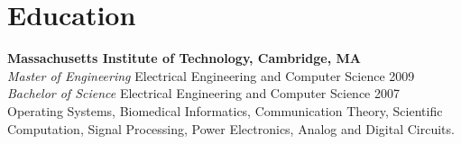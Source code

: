 \section{Education}

\textbf{Massachusetts Institute of Technology, Cambridge, MA}\\
\textit{Master of Engineering} Electrical Engineering and Computer Science
\hfill 2009 \\
\textit{Bachelor of Science} Electrical Engineering and Computer Science
\hfill 2007\\
Operating Systems, Biomedical Informatics, Communication Theory,
Scientific Computation, Signal Processing, Power Electronics,
Analog and Digital Circuits.
\\
